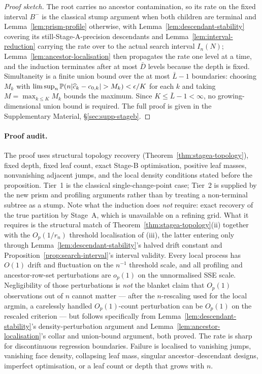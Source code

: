 \documentclass[11pt]{article}
\theoremstyle{plain}
\theoremstyle{definition}
\theoremstyle{remark}
\newcommand{\PP}{\mathbb{P}}
\DeclarePairedDelimiter{\abs}{\lvert}{\rvert}
\begin{document}
\begin{proof}[Proof sketch]
The root carries no ancestor contamination, so its rate on the fixed interval
$B^-$ is the classical stump
argument when both children are terminal and Lemma~\ref{lem:prism-profile}
otherwise, with Lemma~\ref{lem:descendant-stability} covering its
still-Stage-A-precision descendants and
Lemma~\ref{lem:interval-reduction} carrying the rate over to the actual
search interval $I_n(N)$; Lemma~\ref{lem:ancestor-localisation} then
propagates the rate one
level at a time, and the induction terminates after at most $\bar D$ levels because
the depth is fixed. Simultaneity is a finite union bound over the at most
$\bar L-1$ boundaries: choosing $M_k$ with
$\limsup_n\PP(n\abs{\widehat c_k-c_{0,k}}>M_k)<\epsilon/K$ for each $k$ and
taking $M=\max_{k\le K}M_k$ bounds the maximum. Since $K\le\bar L-1<\infty$, no
growing-dimensional union bound is required. The full proof is given in the
Supplementary Material, \S\ref{sec:supp-stageb}.
\end{proof}

\paragraph{Proof audit.}
The proof uses structural topology recovery
(Theorem~\ref{thm:stagea-topology}), fixed depth, fixed leaf count, exact
Stage-B optimisation, positive leaf masses, nonvanishing adjacent jumps, and
the local density conditions stated before the proposition.  Tier~1 is the
classical single-change-point case; Tier~2 is supplied by the new prism and
profiling arguments rather than by treating a non-terminal subtree as a
stump. Note what the induction does \emph{not} require: exact recovery of the
true partition by Stage~A, which is unavailable on a refining grid. What it
requires is the structural match of Theorem~\ref{thm:stagea-topology}(ii)
together with the \(O_p(1/r_n)\) threshold localisation of (iii), the latter
entering only through Lemma~\ref{lem:descendant-stability}'s halved drift
constant and Proposition~\ref{prop:search-interval}'s interval validity.
Every local process has \(O(1)\) drift and fluctuation on the
\(n^{-1}\) threshold scale, and all profiling and ancestor-row-set
perturbations are \(o_p(1)\) on the unnormalised SSE scale. Negligibility of
those perturbations is \emph{not} the blanket claim that \(O_p(1)\)
observations out of \(n\) cannot matter --- after the \(n\)-rescaling used for
the local argmin, a carelessly handled \(O_p(1)\)-count perturbation can be
\(O_p(1)\) on the rescaled criterion --- but follows specifically from
Lemma~\ref{lem:descendant-stability}'s density-perturbation argument and
Lemma~\ref{lem:ancestor-localisation}'s collar and union-bound argument, both
proved.  The rate is sharp
for discontinuous regression boundaries.  Failure is localised to vanishing
jumps, vanishing face density, collapsing leaf mass, singular
ancestor--descendant designs, imperfect optimisation, or a leaf count or
depth that grows with \(n\).
\end{document}
